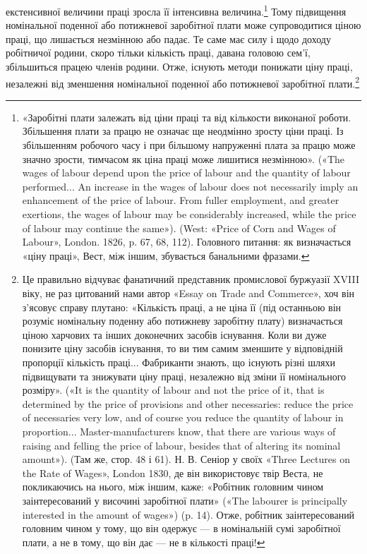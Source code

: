 \parcont{}  %
екстенсивної величини праці зросла її інтенсивна величина.\footnote{
«Заробітні плати залежать від ціни праці та від кількости виконаної
роботи. Збільшення плати за працю не означає ще неодмінно зросту
ціни праці. Із збільшенням робочого часу і при більшому напруженні
плата за працю може значно зрости, тимчасом як ціна праці може лишитися
незмінною». («The wages of labour depend upon the price of labour
and the quantity of labour performed... An increase in the wages of
labour does not necessarily imply an enhancement of the price of labour.
From fuller employment, and greater exertions, the wages of labour may
be considerably increased, while the price of labour may continue the same»).
(West: «Price of Corn and Wages of Labour», London. 1826, p. 67, 68, 112).
Головного питання: як визначається «ціну праці», Вест, між іншим,
збувається банальними фразами.
}
Тому підвищення номінальної поденної або потижневої заробітної
плати може супроводитися ціною праці, що лишається
незмінною або падає. Те саме має силу і щодо доходу робітничої
родини, скоро тільки кількість праці, давана головою сем’ї,
збільшиться працею членів родини. Отже, існують методи понижати
ціну праці, незалежні від зменшення номінальної поденної
або потижневої заробітної плати.\footnote{
Це правильно відчуває фанатичний представник промислової
буржуазії XVIII віку, не раз цитований нами автор «Essay on Trade
and Commerce», хоч він з’ясовує справу плутано: «Кількість праці,
а не ціна її (під останньою він розуміє номінальну поденну або потижневу
заробітну плату) визначається ціною харчових та інших доконечних засобів
існування. Коли ви дуже понизите ціну засобів існування, то ви
тим самим зменшите у відповідній пропорції кількість праці... Фабриканти
знають, що існують різні шляхи підвищувати та знижувати ціну
праці, незалежно від зміни її номінального розміру». («It is the quantity
of labour and not the price of it, that is determined by the price of provisions
and other necessaries: reduce the price of necessaries very low, and
of course you reduce the quantity of labour in proportion... Master-manufacturers
know, that there are various ways of raising and felling the
price of labour, besides that of altering its nominal amount»). (Там же,
стор. 48 і 61). Н. В. Сеніор у своїх «Three Lectures on the Rate of Wages»,
London 1830, де він використовує твір Веста, не покликаючись на
нього, між іншим, каже: «Робітник головним чином заінтересований
у височині заробітної плати» («The labourer is principally interested
in the amount of wages») (p. 14). Отже, робітник заінтересований головним
чином у тому, що він одержує — в номінальній сумі заробітної плати,
а не в тому, що він дає — не в кількості праці!
}

